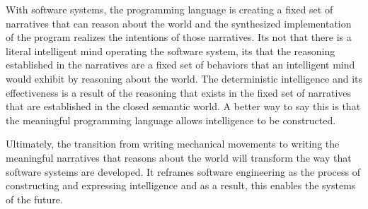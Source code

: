 With software systems, the programming language is creating a fixed set of narratives that can reason about the world and the synthesized implementation of the program realizes the intentions of those narratives. Its not that there is a literal intelligent mind operating the software system, its that the reasoning established in the narratives are a fixed set of behaviors that an intelligent mind would exhibit by reasoning about the world. The deterministic intelligence and its effectiveness is a result of the reasoning that exists in the fixed set of narratives that are established in the closed semantic world. A better way to say this is that the meaningful programming language allows intelligence to be constructed.

Ultimately, the transition from writing mechanical movements to writing the meaningful narratives that reasons about the world will transform the way that software systems are developed. It reframes software engineering as the process of constructing and expressing intelligence and as a result, this enables the systems of the future.


